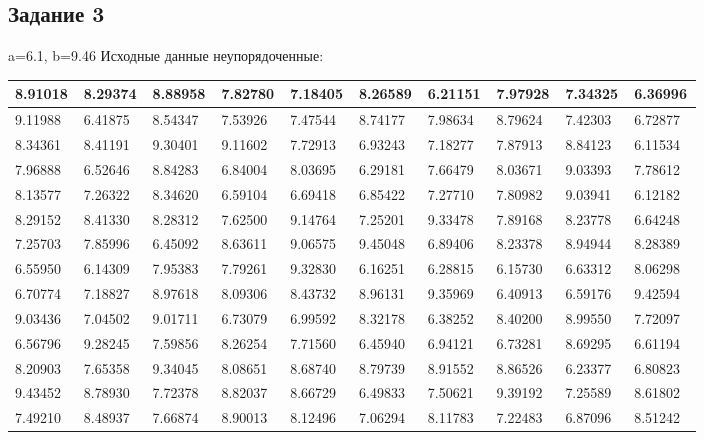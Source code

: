 \subsection{Задание 3}%
\label{subsec:3}%
a=6.1, b=9.46\newline%
\newline%
%
Исходные данные неупорядоченные:\newline%
\newline%
%
\begin{changemargin}{-4cm}{0cm}\small{%
\begin{tabular}{|p{0.08\linewidth}|p{0.08\linewidth}|p{0.08\linewidth}|p{0.08\linewidth}|p{0.08\linewidth}|p{0.08\linewidth}|p{0.08\linewidth}|p{0.08\linewidth}|p{0.08\linewidth}|p{0.08\linewidth}|}%
\hline%
8.91018&8.29374&8.88958&7.82780&7.18405&8.26589&6.21151&7.97928&7.34325&6.36996\\%
\hline%
9.11988&6.41875&8.54347&7.53926&7.47544&8.74177&7.98634&8.79624&7.42303&6.72877\\%
\hline%
8.34361&8.41191&9.30401&9.11602&7.72913&6.93243&7.18277&7.87913&8.84123&6.11534\\%
\hline%
7.96888&6.52646&8.84283&6.84004&8.03695&6.29181&7.66479&8.03671&9.03393&7.78612\\%
\hline%
8.13577&7.26322&8.34620&6.59104&6.69418&6.85422&7.27710&7.80982&9.03941&6.12182\\%
\hline%
8.29152&8.41330&8.28312&7.62500&9.14764&7.25201&9.33478&7.89168&8.23778&6.64248\\%
\hline%
7.25703&7.85996&6.45092&8.63611&9.06575&9.45048&6.89406&8.23378&8.94944&8.28389\\%
\hline%
6.55950&6.14309&7.95383&7.79261&9.32830&6.16251&6.28815&6.15730&6.63312&8.06298\\%
\hline%
6.70774&7.18827&8.97618&8.09306&8.43732&8.96131&9.35969&6.40913&6.59176&9.42594\\%
\hline%
9.03436&7.04502&9.01711&6.73079&6.99592&8.32178&6.38252&8.40200&8.99550&7.72097\\%
\hline%
6.56796&9.28245&7.59856&8.26254&7.71560&6.45940&6.94121&6.73281&8.69295&6.61194\\%
\hline%
8.20903&7.65358&9.34045&8.08651&8.68740&8.79739&8.91552&8.86526&6.23377&6.80823\\%
\hline%
9.43452&8.78930&7.72378&8.82037&8.66729&6.49833&7.50621&9.39192&7.25589&8.61802\\%
\hline%
7.49210&8.48937&7.66874&8.90013&8.12496&7.06294&8.11783&7.22483&6.87096&8.51242\\%

\end{tabular}}
\end{changemargin}
